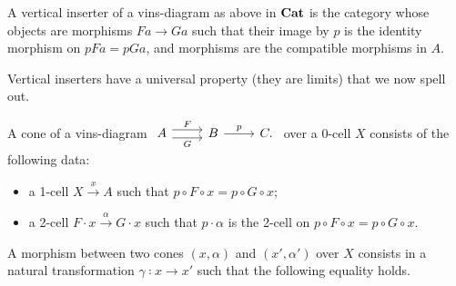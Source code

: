 \begin{example}
  A vertical inserter of a vins-diagram as above in $\mathbf{Cat}$ is the category 
  whose objects are morphisms $ F a → G a $ such that their image by $p$
  is the identity morphism on $p F a = p G a$, and morphisms are the compatible
  morphisms in $A$.
\end{example}
Vertical inserters have a universal property (they are limits)
that we now spell out.

\begin{definition}
  A cone of a vins-diagram $   \begin{tikzcd}
       A \doublerightarrow{r}{F}{G} & B \ar[r,"p"] & C.
       \end{tikzcd}$ over a 0-cell $X$ 
  consists of the following data:
   \begin{itemize}
    \item a 1-cell $X \xrightarrow{x}A$ such that
     $p∘ F∘ x = p ∘ G ∘ x$;
    \item a 2-cell  $ F · x \xrightarrow{α} G · x$ such that 
     $p ⋅ α$ is the 2-cell
     on $p∘ F∘ x = p ∘ G ∘ x$.
   \end{itemize}
   A morphism between two cones $(x,α)$ and $(x',α')$ over $X$ 
   consists in a natural transformation $γ ∶ x → x'$ such that
   the following equality holds.
   \begin{equation}
    \label{eq:mor-cones}

  \end{equation}
\end{definition} 
